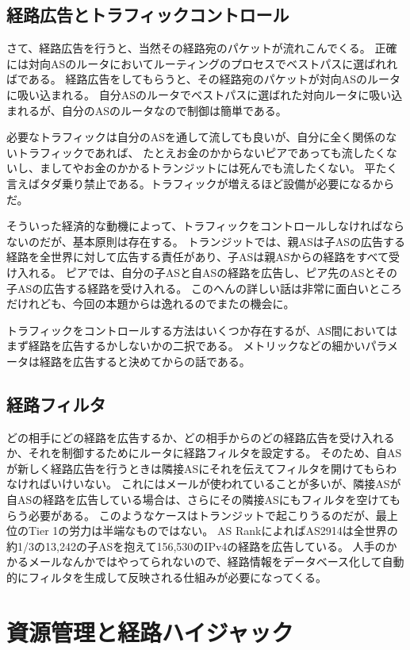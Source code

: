 \subsection{経路広告とトラフィックコントロール}

さて、経路広告を行うと、当然その経路宛のパケットが流れこんでくる。
正確には対向ASのルータにおいてルーティングのプロセスでベストパスに選ばれればである。
経路広告をしてもらうと、その経路宛のパケットが対向ASのルータに吸い込まれる。
自分ASのルータでベストパスに選ばれた対向ルータに吸い込まれるが、自分のASのルータなので制御は簡単である。

必要なトラフィックは自分のASを通して流しても良いが、自分に全く関係のないトラフィックであれば、
たとえお金のかからないピアであっても流したくないし、ましてやお金のかかるトランジットには死んでも流したくない。
平たく言えばタダ乗り禁止である。トラフィックが増えるほど設備が必要になるからだ。

そういった経済的な動機によって、トラフィックをコントロールしなければならないのだが、基本原則は存在する。
トランジットでは、親ASは子ASの広告する経路を全世界に対して広告する責任があり、子ASは親ASからの経路をすべて受け入れる。
ピアでは、自分の子ASと自ASの経路を広告し、ピア先のASとその子ASの広告する経路を受け入れる。
このへんの詳しい話は非常に面白いところだけれども、今回の本題からは逸れるのでまたの機会に。

トラフィックをコントロールする方法はいくつか存在するが、AS間においてはまず経路を広告するかしないかの二択である。
メトリックなどの細かいパラメータは経路を広告すると決めてからの話である。

\subsection{経路フィルタ}

どの相手にどの経路を広告するか、どの相手からのどの経路広告を受け入れるか、それを制御するためにルータに経路フィルタを設定する。
そのため、自ASが新しく経路広告を行うときは隣接ASにそれを伝えてフィルタを開けてもらわなければいけいない。
これにはメールが使われていることが多いが、隣接ASが自ASの経路を広告している場合は、さらにその隣接ASにもフィルタを空けてもらう必要がある。
このようなケースはトランジットで起こりうるのだが、最上位のTier 1の労力は半端なものではない。
AS RankによればAS2914は全世界の約1/3の13,242の子ASを抱えて156,530のIPv4の経路を広告している。
人手のかかるメールなんかではやってられないので、経路情報をデータベース化して自動的にフィルタを生成して反映される仕組みが必要になってくる。

\section{資源管理と経路ハイジャック}

